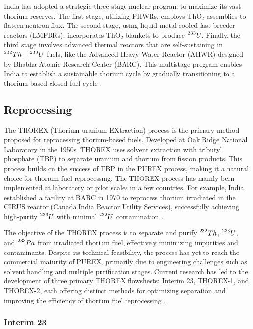 India has adopted a strategic three-stage nuclear program to maximize its vast thorium reserves. The first stage, utilizing PHWRs, employs \(\text{ThO}_2\) assemblies to flatten neutron flux. The second stage, using liquid metal-cooled fast breeder reactors (LMFBRs), incorporates \(\text{ThO}_2\) blankets to produce \(\prescript{233}{}{U}\). Finally, the third stage involves advanced thermal reactors that are self-sustaining in \(\prescript{232}{}{Th}-\prescript{233}{}{U}\) fuels, like the Advanced Heavy Water Reactor (AHWR) designed by Bhabha Atomic Research Center (BARC). This multistage program enables India to establish a sustainable thorium cycle by gradually transitioning to a thorium-based closed fuel cycle \cite{IAEA_Th_Potential}.

\subsection{Reprocessing}

The THOREX (Thorium-uranium EXtraction) process is the primary method proposed for reprocessing thorium-based fuels. Developed at Oak Ridge National Laboratory in the 1950s, THOREX uses solvent extraction with tributyl phosphate (TBP) to separate uranium and thorium from fission products. This process builds on the success of TBP in the PUREX process, making it a natural choice for thorium fuel reprocessing. The THOREX process has mainly been implemented at laboratory or pilot scales in a few countries. For example, India established a facility at BARC in 1970 to reprocess thorium irradiated in the CIRUS reactor (Canada India Reactor Utility Services), successfully achieving high-purity \(\prescript{233}{}{U}\) with minimal \(\prescript{232}{}{U}\) contamination \cite{IAEA_Th_Potential,fuel_cycle_book}.

The objective of the THOREX process is to separate and purify \(\prescript{232}{}{Th}\), \(\prescript{233}{}{U}\), and \(\prescript{233}{}{Pa}\) from irradiated thorium fuel, effectively minimizing impurities and contaminants. Despite its technical feasibility, the process has yet to reach the commercial maturity of PUREX, primarily due to engineering challenges such as solvent handling and multiple purification stages. Current research has led to the development of three primary THOREX flowsheets: Interim 23, THOREX-1, and THOREX-2, each offering distinct methods for optimizing separation and improving the efficiency of thorium fuel reprocessing \cite{fuel_cycle_book}.

\subsubsection{Interim 23}

